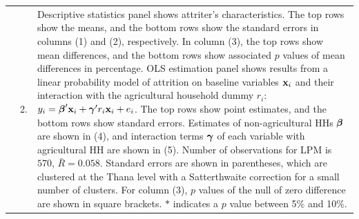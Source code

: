 \documentclass[12pt,letterpaper]{article}
\newcommand{\SAdded}[1]{\textcolor{red}{#1}}
\newcommand{\bfbeta}{\ensuremath{\mbox{\boldmath $\beta$}}}
\newcommand{\bfgamma}{\ensuremath{\mbox{\boldmath $\gamma$}}}
\newcommand{\bfx}{\ensuremath{\mbox{\bf x}}}
\newcommand{\0}{\ensuremath{\mbox{\boldmath $0$}}}
\begin{document}
\begin{table}[bp]
\begin{minipage}[t]{14cm}
\begin{tabular}{>{\hfill\scriptsize}p{1cm}<{}>{\hfill\scriptsize}p{.25cm}<{}>{\scriptsize}p{13.75cm}<{\hfill}}
& 2. & \textsf{Descriptive statistics} panel shows attriter's characteristics. The top rows show the means, and the bottom rows show the standard errors in columns (1) and (2), respectively. In column (3), the top rows show mean differences, and the bottom rows show associated $p$ values of mean differences in percentage. \textsf{OLS estimation} panel shows results from a linear probability model of attrition on baseline variables $\bfx_{i}$ and their interaction with the agricultural household dummy $r_{i}$: $y_{i}=\bfbeta'\bfx_{i}+\bfgamma'r_{i}\bfx_{i}+e_{i}$. The top rows show point estimates, and the bottom rows show standard errors. Estimates of non-agricultural HHs $\bfbeta$ are shown in (4), and interaction terms $\bfgamma$ of each variable with agricultural HH are shown in (5). Number of observations for LPM is $570$, $\bar{R}=0.058$. Standard errors are shown in parentheses, which are clustered at the Thana level with a Satterthwaite correction for a small number of clusters. For column (3), $p$ values of the null of zero difference are shown in square brackets. $*$ indicates a $p$ value between 5\% and 10\%. 
\end{tabular}
\end{minipage}
\end{table}

\end{document}

